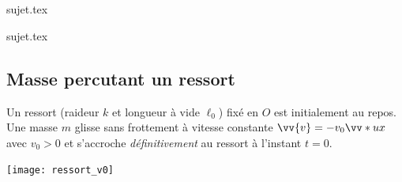 \documentclass[a4paper, 12pt, final, garamond]{book}
\begin{document}
\setcounter{chapter}{3}

\renewcommand{\f}[2]{{
		\mathchoice
		{\dfrac{#1}{#2}}
		{\dfrac{#1}{#2}}
		{\frac{#1}{#2}}
		{\frac{#1}{#2}}
}}

\newcommand{\e}[1]{{}_{\text{#1}}}


\resetQ
\chapter{}

\resetQ
{sujet.tex}

\resetQ
{sujet.tex}

\resetQ
\section{Masse percutant un ressort}

\begin{minipage}{0.70\linewidth}

    Un ressort (raideur $k$ et longueur à vide $\ell_0$) fixé en $O$ est initialement au
    repos. Une masse $m$ glisse sans frottement à vitesse constante $\vv{v} =
    -v_0\vv*{u}{x}$ avec $v_0 > 0$
    et s'accroche \textit{définitivement} au ressort à l'instant $t = 0$.
\end{minipage}
\hfill
\begin{minipage}{0.3\linewidth}
    \centering
    \texttt{[image: ressort\_v0]}
\end{minipage}
\end{document}
